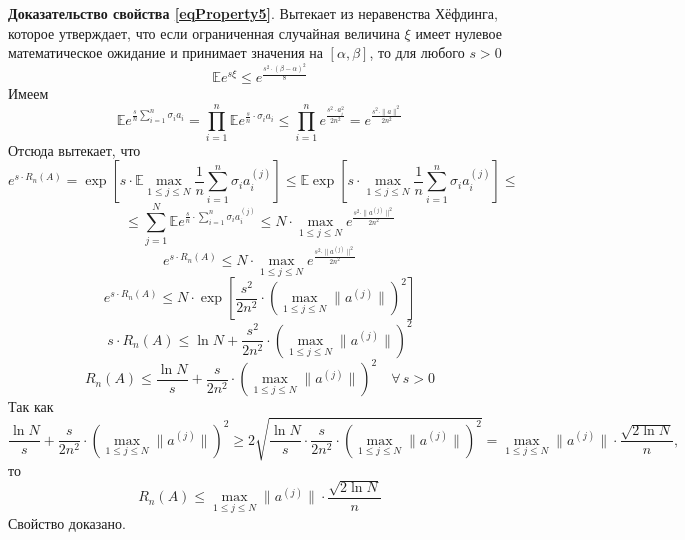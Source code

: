 \documentclass[12pt]{article}
\begin{document}
\textbf{Доказательство свойства \eqref{eqProperty5}}.  Вытекает из неравенства Хёфдинга, которое утверждает, что если ограниченная случайная величина $\xi$ имеет нулевое математическое ожидание и принимает значения на $[\alpha,\beta]$, то для любого $s>0$
\begin{equation*}
	\mathbb{E}e^{s\xi}\leqslant e^{\frac{s^2\cdot(\beta-\alpha)^2}{8}}
\end{equation*}
Имеем
\begin{equation*}
	\mathbb{E}e^{\frac{s}{n}\sum\limits_{i=1}^{n}\sigma_ia_i}=\prod\limits_{i=1}^{n}\mathbb{E}e^{\frac{s}{n}\cdot\sigma_ia_i}\leqslant\prod\limits_{i=1}^{n}e^{\frac{s^2\cdot a_i^2}{2n^2}}=e^{\frac{s^2\cdot\|a\|^2}{2n^2}}
\end{equation*}
Отсюда вытекает, что
\begin{equation*}
	e^{s\cdot R_n(A)}=\exp\left[s\cdot\mathbb{E}\max\limits_{1\leqslant j\leqslant N}\frac{1}{n}\sum\limits_{i=1}^{n}\sigma_ia_i^{(j)}\right]\leqslant\mathbb{E} \exp\left[s\cdot\max\limits_{1\leqslant j\leqslant N}\frac{1}{n}\sum\limits_{i=1}^{n}\sigma_ia_i^{(j)}\right]\leqslant
\end{equation*}
\begin{equation*}
	\leqslant\sum\limits_{j=1}^{N}\mathbb{E}e^{\frac{s}{n}\cdot\sum\limits_{i=1}^{n}\sigma_ia_i^{(j)}}\leqslant N\cdot\max\limits_{1\leqslant j\leqslant N} e^{\frac{s^2\cdot\|a^{(j)}\|^2}{2n^2}}
\end{equation*}
\begin{equation*}
	e^{s\cdot R_n(A)}\leqslant N\cdot\max\limits_{1\leqslant j\leqslant N} e^{\frac{s^2\cdot\|a^{(j)}\|^2}{2n^2}}
\end{equation*}
\begin{equation*}
	e^{s\cdot R_n(A)}\leqslant N\cdot\exp\left[\frac{s^2}{2n^2}\cdot\left(\max\limits_{1\leqslant j\leqslant N}\|a^{(j)}\|\right)^2\right]
\end{equation*}
\begin{equation*}
	s\cdot R_n(A)\leqslant\ln N+\frac{s^2}{2n^2}\cdot\left(\max\limits_{1\leqslant j\leqslant N}\|a^{(j)}\|\right)^2
\end{equation*}
\begin{equation*}
	R_n(A)\leqslant\frac{\ln N}{s}+\frac{s}{2n^2}\cdot\left(\max\limits_{1\leqslant j\leqslant N}\|a^{(j)}\|\right)^2 \quad \forall\, s>0
\end{equation*}
Так как
\begin{equation*}
	\frac{\ln N}{s}+\frac{s}{2n^2}\cdot\left(\max\limits_{1\leqslant j\leqslant N}\|a^{(j)}\|\right)^2\geqslant2\sqrt{\frac{\ln N}{s}\cdot\frac{s}{2n^2}\cdot\left(\max\limits_{1\leqslant j\leqslant N}\|a^{(j)}\|\right)^2}=\max\limits_{1\leqslant j\leqslant N}\|a^{(j)}\|\cdot\frac{\sqrt{2\ln N}}{n},
\end{equation*}
то
\begin{equation*}
	R_n(A)\leqslant\max\limits_{1\leqslant j\leqslant N}\|a^{(j)}\|\cdot\frac{\sqrt{2\ln N}}{n}
\end{equation*}
Свойство доказано.
\end{document}
